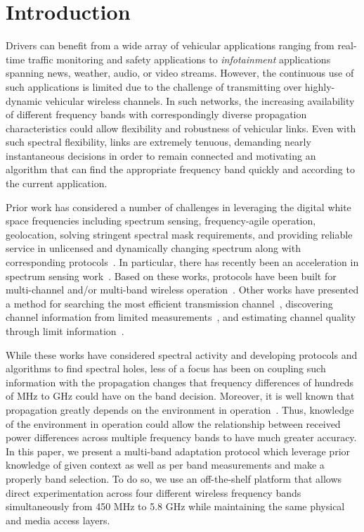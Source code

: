 
\section{Introduction}
\label{sec:introduction}


Drivers can benefit from a wide array of vehicular applications ranging from real-time traffic monitoring and
safety applications to {\it infotainment} applications spanning news, weather, audio, or video streams.  
However, the continuous use of such applications is limited due to the challenge of transmitting over 
highly-dynamic vehicular wireless channels. In such networks, the increasing availability of different 
frequency bands with correspondingly diverse propagation characteristics could allow flexibility and 
robustness of vehicular links. Even with such spectral flexibility, links are extremely tenuous, 
demanding nearly instantaneous decisions in order to remain connected and motivating an algorithm that
can find the appropriate frequency band quickly and according to the current application.

Prior work has considered a number of challenges in
leveraging the digital white space frequencies including spectrum sensing, frequency-agile operation,
geolocation, solving stringent spectral mask requirements, and providing reliable service
in unlicensed and dynamically changing spectrum along with corresponding 
protocols~\cite{shellhammer2009technical}. In particular, there has recently been an acceleration
in spectrum sensing work~\cite{rayanchu2011fluid, kim1996pulse,cabric2004implementation}. Based on 
these works, protocols have been built for multi-channel and/or multi-band wireless operation~\cite{MOAR,
raychaudhuri2003spectrum,sabharwal2007opportunistic}.  Other works have presented a method for searching the most efficient 
transmission channel~\cite{mo2005comparison}, discovering channel information from limited 
measurements~\cite{rayanchu2011fluid, sabharwal2007opportunistic}, and estimating 
channel quality through limit information~\cite{MOAR}. 

While these works have considered spectral activity and developing protocols and algorithms to 
find spectral holes, less of a focus has been on coupling such information with the propagation 
changes that frequency differences of hundreds of MHz to GHz could have on the band decision.  
Moreover, it is well known that propagation greatly depends on the environment in 
operation~\cite{rappaport}.  Thus, 
knowledge of the environment in operation could allow the relationship between received power 
differences across multiple frequency bands to have much greater accuracy.  
In this paper, 
we present a multi-band adaptation protocol which leverage 
prior knowledge of given context as well as per band
measurements and make a properly band selection.
To do so, we use an
off-the-shelf platform that allows direct experimentation across four different wireless
frequency bands simultaneously from 450 MHz to 5.8 GHz while maintaining the same physical
and media access layers.




